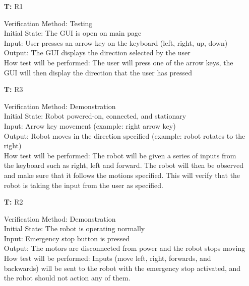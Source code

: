 \documentclass[12pt, titlepage]{article}
\newcounter{tnum} %
\begin{document}
\noindent \begin{itemize}
\item[\textbf{T\refstepcounter{tnum}\thetnum:}]{R1\\}

Verification Method: Testing	\\	
Initial State: The GUI is open on main page\\
Input: User presses an arrow key on the keyboard (left, right, up, down) \\ 
Output: The GUI displays the direction selected by the user \\ 
How test will be performed: The user will press one of the arrow keys, the GUI will then display the direction that the user has pressed\\

\item[\textbf{T\refstepcounter{tnum}\thetnum:}]{R3\\}
 
Verification Method: Demonstration\\
Initial State: Robot powered-on, connected, and stationary \\
Input: Arrow key movement (example: right arrow key) \\ 
Output: Robot moves in the direction specified (example: robot rotates to the right) \\ 
How test will be performed: The robot will be given a series of inputs from the keyboard such as right, left and forward. The robot will then be observed and make sure that it follows the motions specified. This will verify that the robot is taking the input from the user as specified. \\

\item[\textbf{T\refstepcounter{tnum}\thetnum:}]{R2\\}

Verification Method: Demonstration\\
Initial State: The robot is operating normally \\ 
Input: Emergency stop button is pressed \\ 
Output: The motors are disconnected from power and the robot stops moving \\
How test will be performed: Inputs (move left, right, forwards, and backwards) will be sent to the robot with the emergency stop activated, and the robot should not action any of them. \\


\end{itemize}
\end{document}
